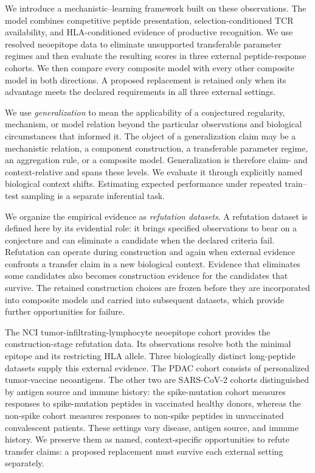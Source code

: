 \documentclass[11pt]{article}
\begin{document}
We introduce a mechanistic--learning framework built on these
observations.
The model combines competitive peptide presentation, selection-conditioned
TCR availability, and HLA-conditioned evidence of productive recognition. We
use resolved neoepitope data to eliminate unsupported transferable parameter
regimes and then evaluate the resulting scores in three external
peptide-response cohorts.
We then compare every composite model with every other composite model in
both directions. A proposed replacement is retained only when its advantage
meets the declared requirements in all three external settings.

We use \emph{generalization} to mean the applicability of a conjectured
regularity, mechanism, or model relation beyond the particular observations
and biological circumstances that informed it. The object of a generalization
claim may be a mechanistic relation, a component construction, a transferable
parameter regime, an aggregation rule, or a composite model.
Generalization is therefore claim- and context-relative and spans these levels.
We evaluate it through explicitly named biological context shifts. Estimating
expected performance under repeated train--test sampling is a separate
inferential task.

We organize the empirical evidence as \emph{refutation datasets}. A refutation
dataset is defined here by its evidential role: it brings specified
observations to bear on a conjecture and can eliminate a candidate when the
declared criteria fail. Refutation can operate during construction and again
when external evidence confronts a transfer claim in a new biological context.
Evidence that eliminates some
candidates also becomes construction evidence for the candidates that survive.
The retained construction choices are frozen before they are incorporated into
composite models and carried into subsequent datasets, which provide further
opportunities for failure.

The NCI tumor-infiltrating-lymphocyte neoepitope cohort provides the
construction-stage refutation data. Its observations resolve both the minimal
epitope and its restricting HLA allele. Three biologically distinct
long-peptide datasets supply this external evidence. The PDAC cohort consists
of personalized tumor-vaccine neoantigens. The other two are SARS-CoV-2 cohorts
distinguished by antigen source and immune history: the spike-mutation cohort
measures responses to spike-mutation peptides in vaccinated healthy donors,
whereas the non-spike cohort measures responses to non-spike peptides in
unvaccinated convalescent patients. These settings vary disease, antigen source,
and immune history. We preserve them as named, context-specific opportunities
to refute transfer claims: a proposed replacement must survive each external
setting separately.
\end{document}

